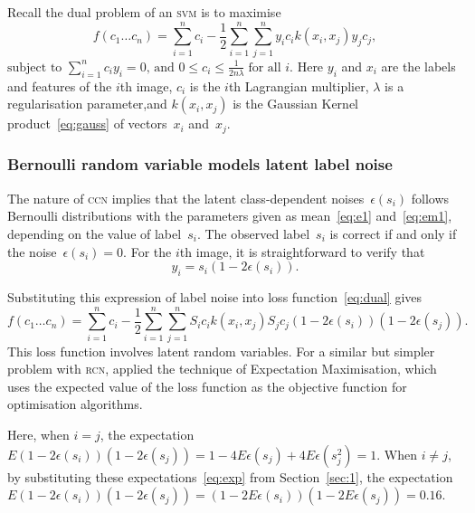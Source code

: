 \documentclass[12pt]{article} %
\begin{document}
Recall the dual problem of an \textsc{svm} is to maximise
\begin{equation}
   f(c_{1}\ldots c_{n})=\sum _{i=1}^{n}c_{i}-{\frac {1}{2}}\sum _{i=1}^{n}\sum _{j=1}^{n}y_{i}c_{i}k(x_{i},x_{j})y_{j}c_{j}, \label{eq:dual}
\end{equation}
\begin{math}
{\text{subject to }}\sum _{i=1}^{n}c_{i}y_{i}=0,\,{\text{and }}0\leq c_{i}\leq {\frac {1}{2n\lambda }}\;{\text{for all }}i.
\end{math}
Here $y_i$ and $x_i$ are the labels and features of the $i$th image, $c_i$ is the $i$th Lagrangian multiplier, $\lambda$ is a regularisation parameter,and $k(x_i,x_j)$ is the Gaussian Kernel product~\eqref{eq:gauss} of vectors~$x_i$ and~$x_j$.

\subsubsection{Bernoulli random variable models latent label noise}
The nature of \textsc{ccn} implies that the latent class-dependent noises~$\epsilon(s_i)$ follows Bernoulli distributions with the parameters given as mean~\eqref{eq:e1} and~\eqref{eq:em1}, depending on the value of label~$s_i$. The observed label~$s_i$ is correct if and only if the noise~$\epsilon(s_i)=0$. For the $i$th image, it is straightforward to verify that
\begin{equation*}
y_i=s_i(1-2\epsilon(s_i)).
\end{equation*}

Substituting this expression of label noise into loss function~\eqref{eq:dual} gives
\begin{equation}
   f(c_{1}\ldots c_{n})=\sum _{i=1}^{n}c_{i}-{\frac {1}{2}}\sum _{i=1}^{n}\sum _{j=1}^{n}S_{i}c_{i}k(x_{i},x_{j})S_{j}c_{j}(1-2\epsilon(s_i))(1-2\epsilon(s_j)). \label{eq:dual2}
\end{equation}
This loss function involves latent random variables. For a similar  but simpler problem with \textsc{rcn}, \citet{pmlr-v20-biggio11} applied the technique of Expectation Maximisation, which uses the expected value of the loss function as the objective function for optimisation algorithms.

Here, when $i=j$, the expectation~$E(1-2\epsilon(s_i))(1-2\epsilon(s_j))=1-4E\epsilon(s_j)+4E\epsilon(s_j^2)=1$.
When $i\neq j$, by substituting these expectations~\eqref{eq:exp} from Section~\ref{sec:1}, the expectation~$E(1-2\epsilon(s_i))(1-2\epsilon(s_j))=(1-2E\epsilon(s_i))(1-2E\epsilon(s_j))=0.16$.
\end{document}
